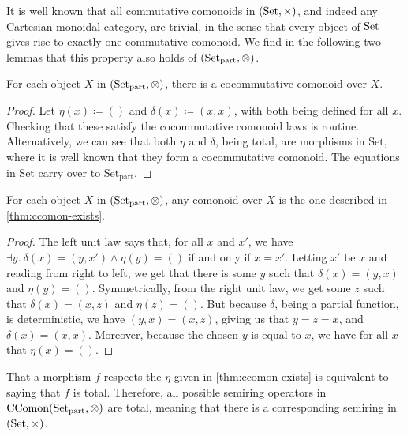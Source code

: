 It is well known that all commutative comonoids in $(\operatorname{Set}, \times)$, and indeed
any Cartesian monoidal category, are trivial, in the sense that every object of
$\operatorname{Set}$ gives rise to exactly one commutative comonoid.
We find in the following two lemmas that this property also holds of
$\plr{\Set_{\mathrm{part}}, \otimes}$.

\begin{lemma}\label{thm:ccomon-exists}
  For each object $X$ in $\plr{\Set_{\mathrm{part}}, {\otimes}}$, there is
  a cocommutative comonoid over $X$.
\end{lemma}
\begin{proof}
  Let $\eta(x) \coloneq ()$ and $\delta(x) \coloneq (x, x)$, with both
  being defined for all $x$.
  Checking that these satisfy the cocommutative comonoid laws is routine.
  Alternatively, we can see that both $\eta$ and $\delta$, being total, are
  morphisms in $\mathrm{Set}$, where it is well known that they form a
  cocommutative comonoid.
  The equations in $\mathrm{Set}$ carry over to $\mathrm{Set}_{\mathrm{part}}$.
\end{proof}

\begin{lemma}\label{thm:ccomon-unique}
  For each object $X$ in $\plr{\Set_{\mathrm{part}}, {\otimes}}$, any
  comonoid over $X$ is the one described in \cref{thm:ccomon-exists}.
\end{lemma}
\begin{proof}
  The left unit law says that, for all $x$ and $x'$, we have
  $\exists y.~\delta(x) = (y, x') \land \eta(y) = ()$ if and only if $x = x'$.
  Letting $x'$ be $x$ and reading from right to left, we get that there is
  some $y$ such that $\delta(x) = (y, x)$ and $\eta(y) = ()$.
  Symmetrically, from the right unit law, we get some $z$ such that
  $\delta(x) = (x, z)$ and $\eta(z) = ()$.
  But because $\delta$, being a partial function, is deterministic, we have
  $(y, x) = (x, z)$, giving us that $y = z = x$, and $\delta(x) = (x, x)$.
  Moreover, because the chosen $y$ is equal to $x$, we have for all $x$ that
  $\eta(x) = ()$.
\end{proof}

That a morphism $f$ respects the $\eta$ given in \cref{thm:ccomon-exists} is
equivalent to saying that $f$ is total.
Therefore, all possible semiring operators in
$\mathrm{CComon}\plr{\Set_{\mathrm{part}}, \otimes}$ are total, meaning that
there is a corresponding semiring in $\plr{\Set, \times}$.


